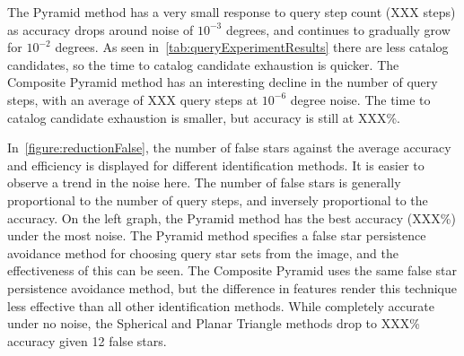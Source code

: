 The Pyramid method has a very small response to query step count (XXX steps) as accuracy drops around noise of
$10^{-3}$ degrees, and continues to gradually grow for $10^{-2}$ degrees.
As seen in~\autoref{tab:queryExperimentResults} there are less catalog candidates, so the time to catalog candidate
exhaustion is quicker.
The Composite Pyramid method has an interesting decline in the number of query steps, with an average of XXX query
steps at $10^{-6}$ degree noise.
The time to catalog candidate exhaustion is smaller, but accuracy is still at XXX\%.

\begin{figure}
\end{figure}

In~\autoref{figure:reductionFalse}, the number of false stars against the average accuracy and efficiency is displayed
for different identification methods.
It is easier to observe a trend in the noise here.
The number of false stars is generally proportional to the number of query steps, and inversely proportional
to the accuracy.
On the left graph, the Pyramid method has the best accuracy (XXX\%) under the most noise.
The Pyramid method specifies a false star persistence avoidance method for choosing query star sets from the image, and
the effectiveness of this can be seen.
The Composite Pyramid uses the same false star persistence avoidance method, but the difference in features render this
technique less effective than all other identification methods.
While completely accurate under no noise, the Spherical and Planar Triangle methods drop to XXX\% accuracy given
12 false stars.

